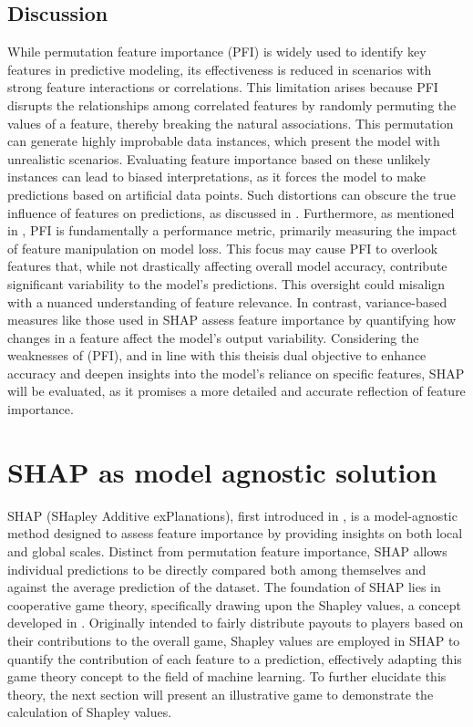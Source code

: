 \documentclass[12pt]{article}
\begin{document}
\subsection{Discussion}
While permutation feature importance (PFI) is widely used to identify key features in predictive modeling, its effectiveness is reduced in scenarios with strong feature interactions or correlations.
This limitation arises because PFI disrupts the relationships among correlated features by randomly permuting the values of a feature, thereby breaking the natural associations.
This permutation can generate highly improbable data instances, which present the model with unrealistic scenarios. Evaluating feature importance based on these unlikely instances can lead to biased interpretations, as it forces the model to make predictions based on artificial data points. Such distortions can obscure the true influence of features on predictions, as discussed in \citep[Section~8.5.5]{molnar2022}.
Furthermore, as mentioned in \citet[Section~2]{molnar2021general}, PFI is fundamentally a performance metric, primarily measuring the impact of feature manipulation on model loss. This focus may cause PFI to overlook features that, while not drastically affecting overall model accuracy, contribute significant variability to the model's predictions. 
 This oversight could misalign with a nuanced understanding of feature relevance.
In contrast, variance-based measures like those used in SHAP assess feature importance by quantifying how changes in a feature affect the model's output variability. Considering the weaknesses of (PFI), and in line with this theisis dual objective to enhance accuracy and deepen insights into the model's reliance on specific features, SHAP will be evaluated, as it promises a more detailed and accurate reflection of feature importance.

\section{SHAP as model agnostic solution}
 SHAP (SHapley Additive exPlanations), first introduced in \citet{10.5555/3295222.3295230}, is a model-agnostic method designed to assess feature importance by providing insights on both local and global scales. Distinct from permutation feature importance, SHAP allows individual predictions to be directly compared both among themselves and against the average prediction of the dataset. 
The foundation of SHAP lies in cooperative game theory, specifically drawing upon the Shapley values, a concept developed in \citet{shapley:book1952}. Originally intended to fairly distribute payouts to players based on their contributions to the overall game, Shapley values are employed in SHAP to quantify the contribution of each feature to a prediction, effectively adapting this game theory concept to the field of machine learning. To further elucidate this theory, the next section will present an illustrative game to demonstrate the calculation of Shapley values.
\end{document}
